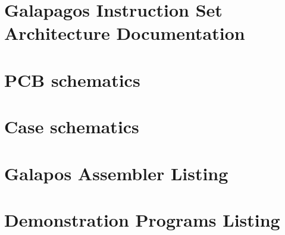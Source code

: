 \appendix
\section{Galapagos Instruction Set Architecture Documentation} \label{appendix:isa}


\appendix
\section{PCB schematics} \label{appendix:pcb-schematics}

\appendix
\section{Case schematics} \label{appendix:case-schematics}

\appendix
\section{Galapos Assembler Listing} \label{appendix:galapagos-assembler-source}

\appendix
\section{Demonstration Programs Listing} \label{appendix:demonstration-programs-source-code}
